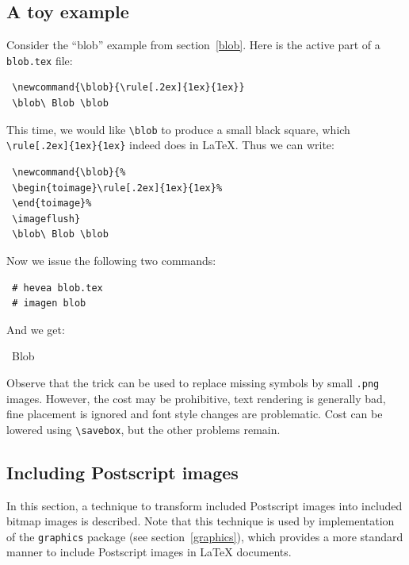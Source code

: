 \subsection{A toy example}
Consider the ``blob'' example from section~\ref{blob}.
Here is the active part of a \texttt{blob.tex} file:
\begin{verbatim}
 \newcommand{\blob}{\rule[.2ex]{1ex}{1ex}}
 \blob\ Blob \blob
\end{verbatim}
This time, we would like \verb+\blob+ to produce a small black square, which
\verb+\rule[.2ex]{1ex}{1ex}+ indeed does in \LaTeX{}.
Thus we can write:
\begin{verbatim}
 \newcommand{\blob}{%
 \begin{toimage}\rule[.2ex]{1ex}{1ex}%
 \end{toimage}%
 \imageflush}
 \blob\ Blob \blob
\end{verbatim}
Now we issue the following two commands:
\begin{verbatim}
 # hevea blob.tex
 # imagen blob
\end{verbatim}
And we get:
\begin{htmlout}
\begin{htmlonly}
\newcommand{\blob}{%
\begin{toimage}\rule[.2ex]{1ex}{1ex}%
\end{toimage}%
\imageflush}\newsavebox{\blobbox}\sbox{\blobbox}{\blob}
\usebox{\blobbox}\ Blob \usebox{\blobbox}
\end{htmlonly}
\begin{latexonly}\vspace*{.5ex}
\end{latexonly}%
\end{htmlout}

Observe that the trick can be used to replace missing symbols by small
\texttt{.png} images. However, the cost may be prohibitive, text rendering
is generally bad, fine placement is ignored and font style changes are
problematic.
Cost can be lowered using \verb+\savebox+, but the other problems remain.


\subsection{Including Postscript images}\label{substimage}
In this section, a technique to transform included Postscript images
into included bitmap images is described.
Note that this technique is used by \hevea{} implementation of the
\texttt{graphics} package (see section~\ref{graphics}),
which provides a more standard manner to include Postscript images in
\LaTeX{} documents.

